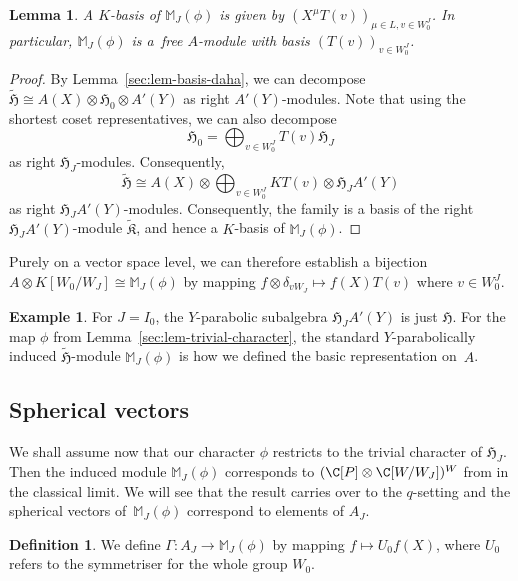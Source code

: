 \documentclass[pdftex]{sigma}
\newtheorem{Lemma}[Theorem]{Lemma}
\theoremstyle{definition}
\newtheorem{Definition}[Theorem]{Definition}
\newtheorem{Example}[Theorem]{Example}
\numberwithin{equation}{section}
\begin{document}
\begin{Lemma}\label{sec:lem-induced-module-basis}
 A $K$-basis of $\mathbb{M}_J(\phi)$ is given by
$
 (X^\mu T(v))_{\mu\in L, v\in W_0^J}$.
 In particular, $\mathbb{M}_J(\phi)$ is a~free $A$-module
 with basis $(T(v))_{v\in W_0^J}$.
\end{Lemma}
\begin{proof}
 By Lemma~\ref{sec:lem-basis-daha}, we can decompose
$\tilde{\mathfrak{H}} \cong A(X)\otimes\mathfrak{H}_0\otimes A'(Y)$
 as right $A'(Y)$-modules. Note that using the shortest coset representatives,
 we can also decompose
 \[
 \mathfrak{H}_0 = \bigoplus_{v\in W_0^J} T(v) \mathfrak{H}_J
 \]
 as right $\mathfrak{H}_J$-modules. Consequently,
 \[
 \tilde{\mathfrak{H}} \cong A(X)\otimes \bigoplus_{v\in W_0^J} KT(v)\otimes \mathfrak{H}_J A'(Y)
 \]
 as right $\mathfrak{H}_J A'(Y)$-modules. Consequently,
 the family  is a basis of the
 right $\mathfrak{H}_J A'(Y)$-module $\tilde{\mathfrak{K}}$, and hence a
 $K$-basis of $\mathbb{M}_J(\phi)$.
\end{proof}

Purely on a vector space level, we can therefore establish
a bijection $A\otimes K[W_0/W_J]\cong \mathbb{M}_J(\phi)$ by mapping
$f\otimes \delta_{vW_J}\mapsto f(X)T(v)$ where $v\in W_0^J$.

\begin{Example}
 For $J=I_0$, the $Y$-parabolic subalgebra $\mathfrak{H}_JA'(Y)$ is just
 $\mathfrak{H}$. For the map $\phi$ from
 Lemma~\ref{sec:lem-trivial-character}, the standard $Y$-parabolically
 induced $\tilde{\mathfrak{H}}$-module $\mathbb{M}_J(\phi)$ is how we
 defined the basic representation on~$A$.
\end{Example}

\subsection{Spherical vectors}\label{sec:spherical-vec}
We shall assume now that our character $\phi$ restricts to the
trivial character of $\mathfrak{H}_J$. Then the induced module
$\mathbb{M}_J(\phi)$ corresponds to $(\C[P]\otimes\C[W/W_J])^W$ from
\cite{mvpVectorValued} in the classical limit. We will see that the result \cite[Lemma~5.1]{mvpVectorValued} carries over to the $q$-setting and the spherical vectors
of~$\mathbb{M}_J(\phi)$
correspond to elements of $A_J$.

\begin{Definition}
 We define $\Gamma\colon A_J\to \mathbb{M}_J(\phi)$ by mapping
$ f \mapsto U_0 f(X)$,
 where $U_0$ refers to the symmetriser for the whole group $W_0$.
\end{Definition}
\end{document}

